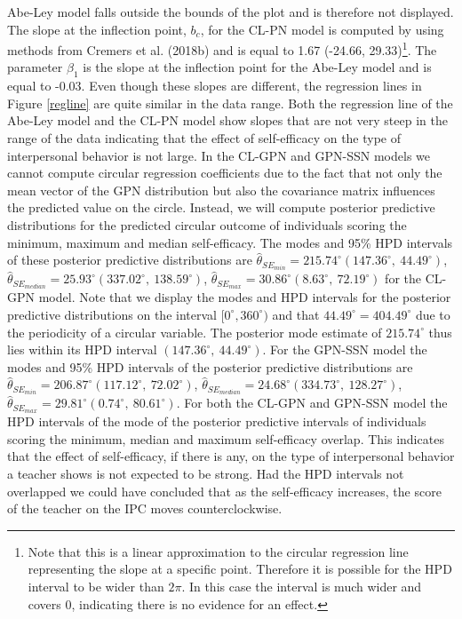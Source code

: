 \documentclass[man,mask]{apa6}
\let\rmarkdownfootnote\footnote%
\def\footnote{\protect\rmarkdownfootnote}
\begin{document}
Abe-Ley model falls outside the bounds of the plot and is therefore not
displayed. The slope at the inflection point, \(b_c\), for the CL-PN model is
computed by using methods from Cremers et al. (2018b) and is equal to 1.67
(-24.66, 29.33)\footnote{Note that this is a linear approximation to the
circular regression line representing the slope at a specific point. Therefore
it is possible for the HPD interval to be wider than $2\pi$. In this case the
interval is much wider and covers 0, indicating there is no evidence for an
effect.}. The parameter \(\beta_1\) is the slope at the inflection point for the
Abe-Ley model and is equal to -0.03. Even though these slopes are
different, the regression lines in Figure \ref{regline} are quite similar in the
data range. Both the regression line of the Abe-Ley model and the CL-PN model
show slopes that are not very steep in the range of the data indicating that the
effect of self-efficacy on the type of interpersonal behavior is not large.
\newline
\indent In the CL-GPN and GPN-SSN models we cannot compute circular regression
coefficients due to the fact that not only the mean vector of the GPN
distribution but also the covariance matrix influences the predicted value on
the circle. Instead, we will compute posterior predictive distributions for the
predicted circular outcome of individuals scoring the minimum, maximum and
median self-efficacy. The modes and 95\% HPD intervals of these posterior
predictive distributions are \(\hat{\theta}_{SE_{min}} = 215.74^\circ (147.36^\circ, \: 44.49^\circ)\), \(\hat{\theta}_{SE_{median}} = 25.93^\circ (337.02^\circ, \: 138.59^\circ)\), \(\hat{\theta}_{SE_{max}} = 30.86^\circ (8.63^\circ, \: 72.19^\circ)\) for the CL-GPN model. Note that we display the
modes and HPD intervals for the posterior predictive distributions on the
interval \([0^\circ, 360^\circ)\) and that \(44.49^\circ = 404.49^\circ\) due to the
periodicity of a circular variable. The posterior mode estimate of
\(215.74^\circ\) thus lies within its HPD interval \((147.36^\circ, \: 44.49^\circ)\). For the GPN-SSN model the modes and 95\% HPD intervals of the
posterior predictive distributions are \(\hat{\theta}_{SE_{min}} = 206.87^\circ (117.12^\circ, \: 72.02^\circ)\), \(\hat{\theta}_{SE_{median}} = 24.68^\circ (334.73^\circ, \: 128.27^\circ)\), \(\hat{\theta}_{SE_{max}} = 29.81^\circ (0.74^\circ, \: 80.61^\circ)\). For both the CL-GPN and GPN-SSN model the HPD
intervals of the mode of the posterior predictive intervals of individuals
scoring the minimum, median and maximum self-efficacy overlap. This indicates
that the effect of self-efficacy, if there is any, on the type of interpersonal
behavior a teacher shows is not expected to be strong. Had the HPD intervals not
overlapped we could have concluded that as the self-efficacy increases, the
score of the teacher on the IPC moves counterclockwise.
\end{document}
